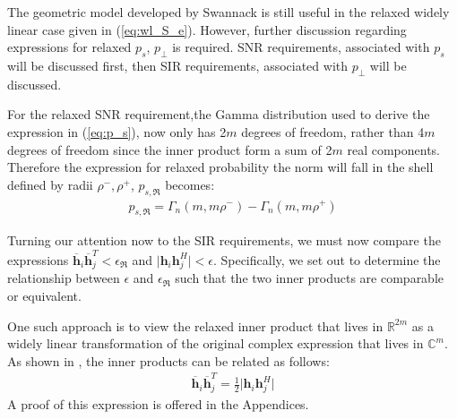 The geometric model developed by Swannack is still useful in the relaxed widely linear case given in (\ref{eq:wl_S_e}). However, further discussion regarding expressions for relaxed $p_s$, $p_\perp$ is required. SNR requirements, associated with $p_s$ will be discussed first, then SIR requirements, associated with $p_\perp$ will be discussed.

For the relaxed SNR requirement,the Gamma distribution used to derive the expression in (\ref{eq:p_s}), now only has 2$m$ degrees of freedom, rather than 4$m$ degrees of freedom since the inner product form a sum of 2$m$ real components. Therefore the expression for relaxed probability the norm will fall in the shell defined by radii $\rho^-,\rho^+$, $p_{s,\mathfrak{R}}$ becomes:
\begin{equation}\label{eq:p_s_real}
    \begin{aligned}
        p_{s,\mathfrak{R}} = \Gamma_n(m,m\rho^-) - \Gamma_n(m,m\rho^+)
    \end{aligned}
\end{equation}

Turning our attention now to the SIR requirements, we must now compare the expressions $\overline{\textbf{h}}_i \overline{\textbf{h}}_j^T < \epsilon_\mathfrak{R}$ and $\vert \textbf{h}_i\textbf{h}_j^H \vert < \epsilon$. Specifically, we set out to determine the relationship between $\epsilon$ and $\epsilon_\mathfrak{R}$ such that the two inner products are comparable or equivalent.

One such approach is to view the relaxed inner product that lives in $\mathbb{R}^{2m}$ as a widely linear transformation of the original complex expression that lives in $\mathbb{C}^{m}$. As shown in \cite{Adali2011}, the inner products can be related as follows:
\begin{equation}\label{eq:wl_inner_product}
    \begin{aligned}
       \overline{\textbf{h}}_i \overline{\textbf{h}}_j^T = \frac{1}{2}\vert \textbf{h}_i\textbf{h}_j^H \vert
    \end{aligned}
\end{equation}
A proof of this expression is offered in the Appendices.
